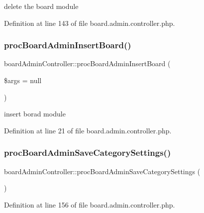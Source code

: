 delete the board module 



Definition at line 143 of file board.\+admin.\+controller.\+php.

\hypertarget{classboardAdminController_a4d236333faef58446094c8d5d66228b1}{}\label{classboardAdminController_a4d236333faef58446094c8d5d66228b1} 
\subsubsection{\texorpdfstring{proc\+Board\+Admin\+Insert\+Board()}{procBoardAdminInsertBoard()}}
{\footnotesize\ttfamily board\+Admin\+Controller\+::proc\+Board\+Admin\+Insert\+Board (\begin{DoxyParamCaption}\item[{}]{\$args = {\ttfamily null} }\end{DoxyParamCaption})}



insert borad module 



Definition at line 21 of file board.\+admin.\+controller.\+php.

\hypertarget{classboardAdminController_a0a35a01898405781ecaecca2bc34e709}{}\label{classboardAdminController_a0a35a01898405781ecaecca2bc34e709} 
\subsubsection{\texorpdfstring{proc\+Board\+Admin\+Save\+Category\+Settings()}{procBoardAdminSaveCategorySettings()}}
{\footnotesize\ttfamily board\+Admin\+Controller\+::proc\+Board\+Admin\+Save\+Category\+Settings (\begin{DoxyParamCaption}{ }\end{DoxyParamCaption})}



Definition at line 156 of file board.\+admin.\+controller.\+php.

